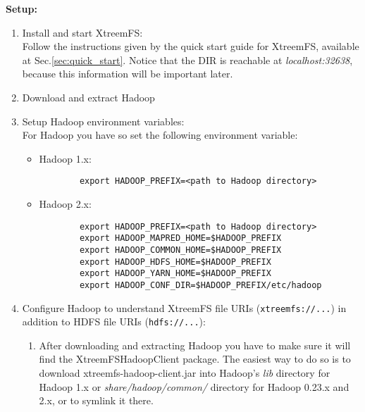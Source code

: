 \documentclass[a4paper,10pt]{book}
\begin{document}
\textbf{Setup:}
\begin{enumerate}
\item Install and start XtreemFS:\\
	Follow the instructions given by the quick start guide for XtreemFS, available at Sec.\ref{sec:quick_start}. Notice
	that the DIR is reachable at \textit{localhost:32638}, because this information will be important later.

\item Download and extract Hadoop

\item Setup Hadoop environment variables:\\
For Hadoop you have so set the following environment variable:
   \begin{itemize}
   \item Hadoop 1.x:
      \begin{verbatim}
		export HADOOP_PREFIX=<path to Hadoop directory>
      \end{verbatim}

   \item Hadoop 2.x:
      \begin{verbatim}
		export HADOOP_PREFIX=<path to Hadoop directory>
		export HADOOP_MAPRED_HOME=$HADOOP_PREFIX
		export HADOOP_COMMON_HOME=$HADOOP_PREFIX
		export HADOOP_HDFS_HOME=$HADOOP_PREFIX
		export HADOOP_YARN_HOME=$HADOOP_PREFIX
		export HADOOP_CONF_DIR=$HADOOP_PREFIX/etc/hadoop
      \end{verbatim}
   \end{itemize}

\item Configure Hadoop to understand XtreemFS file URIs (\texttt{xtreemfs://...}) in addition to HDFS file URIs (\texttt{hdfs://...}):
	\begin{enumerate}
	\item After downloading and extracting Hadoop you have to make sure it will find the XtreemFSHadoopClient package.
	The easiest way to do so is to download xtreemfs-hadoop-client.jar into Hadoop's \textit{lib} directory for Hadoop 1.x or \textit{share/hadoop/common/} directory for Hadoop 0.23.x and 2.x, or to symlink it there.


\end{enumerate}
\end{enumerate}
\end{document}
